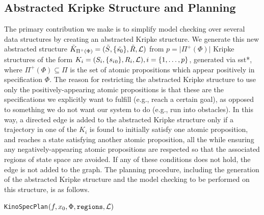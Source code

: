 \subsection{Abstracted Kripke Structure and Planning}

The primary contribution we make is to simplify model checking over several data structures by creating an abstracted Kripke structure. We generate this new abstracted structure ${\tilde{K}_{\Pi^+(\Phi)} = (\tilde{S}, \{ \tilde{s_0} \}, \tilde{R}, \mathcal{L})}$ from $p = \lvert {\Pi^+(\Phi)} \rvert$ Kripke structures of the form ${K_i = (S_i, \{ {s_i}_0 \}, R_i, \mathcal{L})}, i = \{1, \mathellipsis, p \}$, generated via \gls{sst}*, where $\Pi^+(\Phi) \subseteq \Pi$ is the set of atomic propositions which appear positively in specification $\Phi$. The reason for restricting the abstracted Kripke structure to use only the positively-appearing atomic propositions is that these are the specifications we explicitly want to fulfill (e.g., reach a certain goal), as opposed to something we do not want our system to do (e.g., run into obstacles). In this way, a directed edge is added to the abstracted Kripke structure only if a trajectory in one of the $K_i$ is found to initially satisfy one atomic proposition, and reaches a state satisfying another atomic proposition, all the while ensuring any negatively-appearing atomic propositions are respected so that the associated regions of state space are avoided. If any of these conditions does not hold, the edge is not added to the graph. The planning procedure, including the generation of the abstracted Kripke structure and the model checking to be performed on this structure, is as follows.

\begin{algorithm}
\caption{\texttt{KinoSpecPlan}$(f, x_0, \Phi, \texttt{regions}, \mathcal{L})$}
\label{alg:kinospecplan}
\begin{algorithmic}[1]
    \label{alg:kinoplan:start}
    \label{alg:kinoplan:start2}
    \label{alg:kinoplan:initK}
        \label{alg:kinoplan:initK2}
    \EndFor{}
    \label{alg:kinoplan:sst}
            \label{alg:kinoplan:sst2}
        \EndFor{}
        \label{alg:kinoplan:abstract}
    \EndWhile{}
    \label{alg:kinoplan:end}
\end{algorithmic}{}
\end{algorithm}

